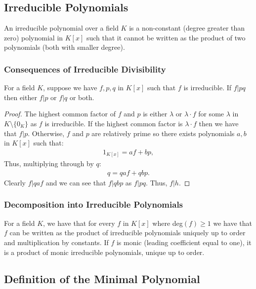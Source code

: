 \subsection{Irreducible Polynomials}

An irreducible polynomial over a field $K$ is a non-constant (degree greater than zero)
polynomial in $K[x]$ such that it cannot be written as the product of two polynomials 
(both with smaller degree).

\subsubsection{Consequences of Irreducible Divisibility}

For a field $K$, suppose we have $f, p, q$ in $K[x]$ such that $f$ is
irreducible. If $f | pq$ then either $f | p$ or $f | q$ or both.
\begin{proof}
    The highest common factor of $f$ and $p$ is either $\lambda$ or 
    $\lambda \cdot f$ for some $\lambda$ in $K\setminus\{0_K\}$ as $f$ 
    is irreducible. If the highest common factor is $\lambda \cdot f$
    then we have that $f | p$. Otherwise, $f$ and $p$ are relatively
    prime so there exists polynomials $a, b$ in $K[x]$ such that: \begin{gather*}
        1_{K[x]} = af + bp,
    \end{gather*} Thus, multiplying through by $q$: \begin{gather*}
        q = qaf + qbp. 
    \end{gather*} Clearly $f | qaf$ and we can see that $f | qbp$ as
    $f | pq$. Thus, $f | h$.
\end{proof}

\subsubsection{Decomposition into Irreducible Polynomials}

For a field $K$, we have that for every $f$ in $K[x]$ where deg$(f) \geq 1$ we have that 
$f$ can be written as the product of irreducible polynomials uniquely up to order and
multiplication by constants. If $f$ is monic (leading coefficient equal to one), 
it is a product of monic irreducible polynomials, unique up to order.

\subsection{Definition of the Minimal Polynomial}

